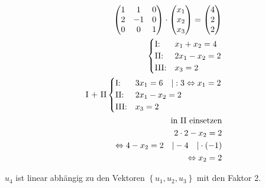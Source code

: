 \begin{align*}
    \begin{pmatrix}
        1 & 1 & 0 \\ 2 & -1 & 0 \\ 0 & 0 & 1
    \end{pmatrix} \cdot \begin{pmatrix}
                            x_1 \\ x_2 \\ x_3
                        \end{pmatrix} = \begin{pmatrix}
                                            4 \\ 2 \\ 2
                                        \end{pmatrix}          \\
    \begin{cases}
        \text{I:\@}   & x_1 + x_2 = 4  \\
        \text{II:\@}  & 2x_1 - x_2 = 2 \\
        \text{III:\@} & x_3 = 2
    \end{cases}                              \\
    \text{I + II}
    \begin{cases}
        \text{I:\@}   & 3x_1 = 6 \quad | :3 \Leftrightarrow x_1 = 2 \\
        \text{II:\@}  & 2x_1 - x_2 = 2                              \\
        \text{III:\@} & x_3 = 2
    \end{cases} \\
    \text{in II einsetzen}                                      \\
    2 \cdot 2 - x_2 = 2                                         \\
    \Leftrightarrow 4 - x_2 = 2 \quad | -4 \quad | \cdot(-1)    \\
    \Leftrightarrow x_2 = 2
\end{align*}

$u_4$ ist linear abhängig zu den Vektoren $\left\{u_1, u_2, u_3\right\}$ mit den Faktor 2.

